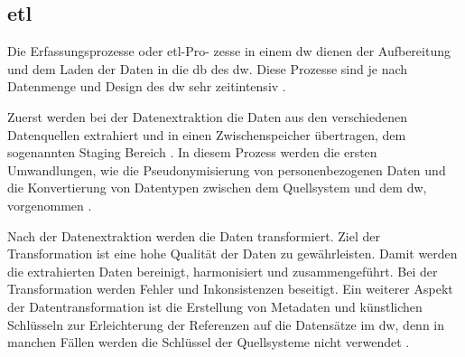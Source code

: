 
\subsection{\acs{etl}} \label{subsec:etl} 

Die Erfassungsprozesse oder \acf{etl}-Pro- zesse in einem \ac{dw} dienen der Aufbereitung und dem Laden der Daten in die \ac{db} des \ac{dw}. Diese Prozesse sind je nach Datenmenge und Design des \ac{dw} sehr zeitintensiv \cite{dwbauer, dwtool}.

Zuerst werden bei der Datenextraktion die Daten aus den verschiedenen Datenquellen extrahiert und in einen Zwischenspeicher übertragen, dem sogenannten Staging Bereich \cite{dwtool}. In diesem Prozess werden die ersten Umwandlungen, wie die Pseudonymisierung von personenbezogenen Daten und die Konvertierung von Datentypen zwischen dem Quellsystem und dem \ac{dw}, vorgenommen \cite{dwbauer}.

Nach der Datenextraktion werden die Daten transformiert. Ziel der Transformation ist eine hohe Qualität der Daten zu gewährleisten. Damit werden die extrahierten Daten bereinigt, harmonisiert und zusammengeführt. Bei der Transformation werden Fehler und Inkonsistenzen beseitigt. Ein weiterer Aspekt der Datentransformation ist die Erstellung von Metadaten und künstlichen Schlüsseln zur Erleichterung der Referenzen auf die Datensätze im \ac{dw}, denn in manchen Fällen werden die Schlüssel der Quellsysteme nicht verwendet \cite{dwbauer, dwtool}.

